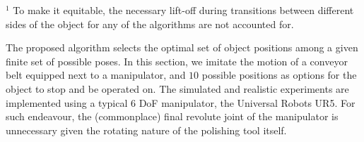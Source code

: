 \documentclass[letterpaper, 10pt, conference]{ieeeconf}
\begin{document}
\begin{table}[t]
\centering
\caption{Coverage Planners Comparison}
\renewcommand{\arraystretch}{1.2}
\begin{tablenotes}
\item $^1$ To make it equitable, the necessary lift-off during transitions between different sides of the object for any of the algorithms are not accounted for.
\end{tablenotes}
\vspace{-0.5cm}
\end{table}


The proposed algorithm selects the optimal set of object positions among a given finite set of possible poses. 
In this section, we imitate the motion of a conveyor belt equipped next to a manipulator, and $10$ possible positions as options for the object to stop and be operated on. 
The simulated and realistic experiments are implemented using a typical 6 DoF manipulator, 
the Universal Robots UR5. %
For such endeavour, the (commonplace) final revolute joint of the manipulator%
is unnecessary given the rotating nature of the polishing tool itself. 
\end{document}
